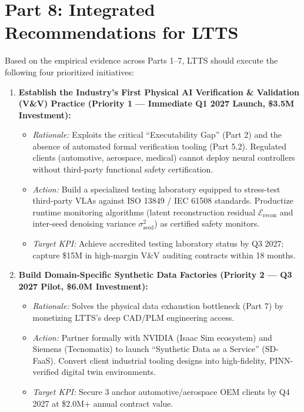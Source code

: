 \documentclass[11pt,a4paper]{article}
\begin{document}
\section{Part 8: Integrated Recommendations for LTTS}

Based on the empirical evidence across Parts 1--7, LTTS should execute the following four prioritized initiatives:

\begin{enumerate}
    \item \textbf{Establish the Industry's First Physical AI Verification \& Validation (V\&V) Practice (Priority 1 --- Immediate Q1 2027 Launch, \$3.5M Investment):}
    \begin{itemize}
        \item \textit{Rationale:} Exploits the critical ``Executability Gap'' (Part 2) and the absence of automated formal verification tooling (Part 5.2). Regulated clients (automotive, aerospace, medical) cannot deploy neural controllers without third-party functional safety certification.
        \item \textit{Action:} Build a specialized testing laboratory equipped to stress-test third-party VLAs against ISO 13849 / IEC 61508 standards. Productize runtime monitoring algorithms (latent reconstruction residual $\mathcal{E}_{\text{recon}}$ and inter-seed denoising variance $\sigma^2_{\text{seed}}$) as certified safety monitors.
        \item \textit{Target KPI:} Achieve accredited testing laboratory status by Q3 2027; capture \$15M in high-margin V\&V auditing contracts within 18 months.
    \end{itemize}

    \item \textbf{Build Domain-Specific Synthetic Data Factories (Priority 2 --- Q3 2027 Pilot, \$6.0M Investment):}
    \begin{itemize}
        \item \textit{Rationale:} Solves the physical data exhaustion bottleneck (Part 7) by monetizing LTTS's deep CAD/PLM engineering access.
        \item \textit{Action:} Partner formally with NVIDIA (Isaac Sim ecosystem) and Siemens (Tecnomatix) to launch ``Synthetic Data as a Service'' (SD-FaaS). Convert client industrial tooling designs into high-fidelity, PINN-verified digital twin environments.
        \item \textit{Target KPI:} Secure 3 anchor automotive/aerospace OEM clients by Q4 2027 at \$2.0M+ annual contract value.
    \end{itemize}


\end{enumerate}
\end{document}

